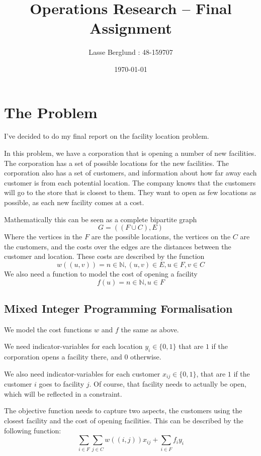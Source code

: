 \documentclass[12pt]{report}
\title{Operations Research -- Final Assignment}
\author{Lasse Berglund : 48-159707}
\date{\today}
\begin{document}
\maketitle

\section*{The Problem}

	I've decided to do my final report on the facility location problem.

	In this problem, we have a corporation that is opening a number of new facilities. The corporation has a set of possible locations for the new facilities. The corporation also has a set of customers, and information about how far away each customer is from each potential location. The company knows that the customers will go to the store that is closest to them. They want to open as few locations as possible, as each new facility comes at a cost. 

	Mathematically this can be seen as a complete bipartite graph  
		$$G = ((F\cup C),E)$$
	Where the vertices in the $F$ are the possible locations, the vertices on the $C$ are the customers, and the costs over the edges are the distances between the customer and location. These costs are described by the function
		$$ w((u,v)) = n\in \mathbb{N}, (u,v)\in E, u\in F, v\in C $$
	We also need a function to model the cost of opening a facility
		$$ f(u) = n\in \mathbb{N}, u\in F$$

\subsection*{Mixed Integer Programming Formalisation}

	We model the cost functions $w$ and $f$ the same as above. 

	We need indicator-variables for each location $y_i \in \{0,1\}$ that are $1$ if the corporation opens a facility there, and $0$ otherwise.

	We also need indicator-variables for each customer $x_{ij} \in \{0,1\}$, that are $1$ if the customer $i$ goes to facility $j$. Of course, that facility needs to actually be open, which will be reflected in a constraint.

	The objective function needs to capture two aspects, the customers using the closest facility and the cost of opening facilities. This can be described by the following function:
	$$ \sum_{i\in F}\sum_{j\in C} w((i,j))x_{ij} + \sum_{i\in F}f_i y_i$$
\end{document}
